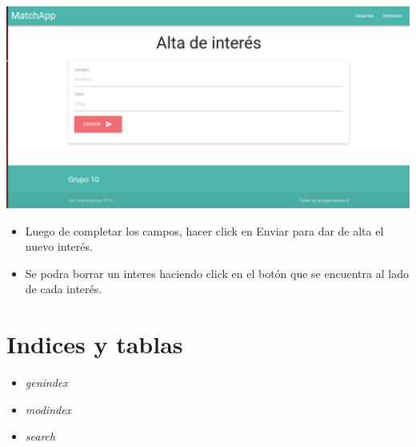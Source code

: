 \documentclass[letterpaper,10pt,english]{sphinxmanual}
\begin{document}
\includegraphics{shared_altaInteres.png}
\begin{itemize}
\item {} 
Luego de completar los campos, hacer click en Enviar para dar de alta el nuevo interés.

\item {} 
Se podra borrar un interes haciendo click en el botón que se encuentra al lado de cada interés.

\end{itemize}


\chapter{Indices y tablas}
\label{index:indices-y-tablas}\begin{itemize}
\item {} 
\emph{genindex}

\item {} 
\emph{modindex}

\item {} 
\emph{search}

\end{itemize}



\renewcommand{\indexname}{Index}
\printindex
\end{document}
